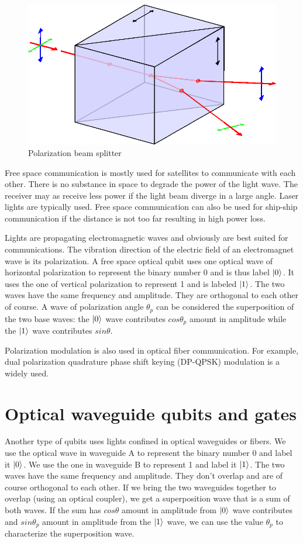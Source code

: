 \documentclass[Letter,11pt]{book}
\begin{document}
\begin{figure}[ht]
\includegraphics[width=12cm]{pic/Wollaston-prism.eps}
\caption{Polarization beam splitter}
\label{Polarizer}
\end{figure}

Free space communication is mostly used for satellites to communicate with each other. There is no substance in space to degrade the power of the light wave. The receiver may as receive less power if the light beam diverge in a large angle. Laser lights are typically used. Free space communication can also be used for ship-ship communication if the distance is not too far resulting in high power loss.

Lights are propagating electromagnetic waves and obviously are best suited for communications. The vibration direction of the electric field of an electromagnet wave is its polarization. A free space optical qubit uses one optical wave of horizontal polarization to represent the binary number 0 and is thus label $\vert {0} \rangle_{}$. It uses the one of vertical polarization to represent 1 and is labeled $\vert {1} \rangle_{}$. The two waves have the same frequency and amplitude. They are orthogonal to each other of course. A wave of polarization angle $\theta_p$ can be considered the superposition of the two base waves: the $\vert {0} \rangle_{}$ wave contributes $cos\theta_p$ amount in amplitude while the $\vert {1} \rangle_{}$ wave contributes $sin\theta$.

Polarization modulation is also used in optical fiber communication. For example, dual polarization quadrature phase shift keying (DP-QPSK) modulation is a widely used.

\section{Optical waveguide qubits and gates}
Another type of qubits uses lights confined in optical waveguides or fibers. We use the optical wave in waveguide A to represent the binary number 0 and label it $\vert {0} \rangle_{}$. We use the one in waveguide B to represent 1 and label it $\vert {1} \rangle_{}$. The two waves have the same frequency and amplitude. They don't overlap and are of course orthogonal to each other. If we bring the two waveguides together to overlap (using an optical coupler), we get a superposition wave that is a sum of both waves. If the sum has $cos\theta$ amount in amplitude from $\vert {0} \rangle_{}$ wave contributes and $sin\theta_p$ amount in amplitude from the $\vert {1} \rangle_{}$ wave, we can use the value $\theta_p$ to characterize the superposition wave.
\end{document}
